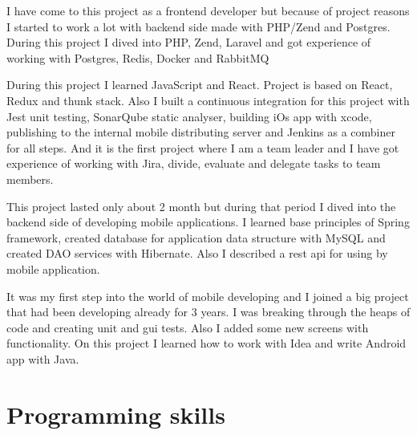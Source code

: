 \documentclass[11pt,a4paper,sans]{moderncv} %
\begin{document}
{I have come to this project as a frontend developer but because of project reasons I started to work a lot with backend side made with PHP/Zend and Postgres. During this project I dived into PHP, Zend, Laravel and got experience of working with Postgres, Redis, Docker and RabbitMQ}

{During this project I learned JavaScript and React. Project is based on React, Redux and thunk stack. Also I built a continuous integration for this project with Jest unit testing, SonarQube static analyser, building iOs app with xcode, publishing to the internal mobile distributing server and Jenkins as a combiner for all steps. And it is the first project where I am a team leader and I have got experience of working with Jira, divide, evaluate and delegate tasks to team members.}

{This project lasted only about 2 month but during that period I dived into the backend side of developing mobile applications. I learned base principles of Spring framework, created database for application data structure with MySQL and created DAO services with Hibernate. Also I described a rest api for using by mobile application.}

{It was my first step into the world of mobile developing and I joined a big project that had been developing already for 3 years. I was breaking through the heaps of code and creating unit and gui tests. Also I added some new screens with functionality. On this project I learned how to work with Idea and write Android app with Java.}



\section{Programming skills}
\end{document}
